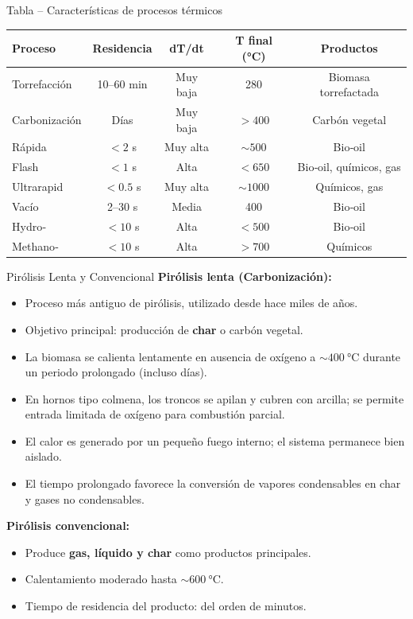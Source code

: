 \documentclass[../../main.tex]{subfiles}
\begin{document}
\begin{frame}{Tabla – Características de procesos térmicos}
\small
\begin{tabular}{@{}lcccc@{}}
\toprule
\textbf{Proceso} & \textbf{Residencia} & \textbf{dT/dt} & \textbf{T final (°C)} & \textbf{Productos} \\
\midrule
Torrefacción   & 10--60 min & Muy baja  & 280      & Biomasa torrefactada \\
Carbonización  & Días       & Muy baja  & $>400$   & Carbón vegetal \\
Rápida         & $<2$ s     & Muy alta  & $\sim500$ & Bio‑oil \\
Flash          & $<1$ s     & Alta      & $<650$   & Bio‑oil, químicos, gas \\
Ultrarapid     & $<0.5$ s   & Muy alta  & $\sim1000$ & Químicos, gas \\
Vacío          & 2--30 s    & Media     & 400      & Bio‑oil \\
Hydro‑         & $<10$ s    & Alta      & $<500$   & Bio‑oil \\
Methano‑       & $<10$ s    & Alta      & $>700$   & Químicos \\
\bottomrule
\end{tabular}
\end{frame}

\begin{frame}{Pirólisis Lenta y Convencional}
\footnotesize
\textbf{Pirólisis lenta (Carbonización):}
\begin{itemize}
  \item Proceso más antiguo de pirólisis, utilizado desde hace miles de años.
  \item Objetivo principal: producción de \textbf{char} o carbón vegetal.
  \item La biomasa se calienta lentamente en ausencia de oxígeno a $\sim\SI{400}{\degreeCelsius}$ durante un periodo prolongado (incluso días).
  \item En hornos tipo colmena, los troncos se apilan y cubren con arcilla; se permite entrada limitada de oxígeno para combustión parcial.
  \item El calor es generado por un pequeño fuego interno; el sistema permanece bien aislado.
  \item El tiempo prolongado favorece la conversión de vapores condensables en char y gases no condensables.
\end{itemize}

\textbf{Pirólisis convencional:}
\begin{itemize}
  \item Produce \textbf{gas, líquido y char} como productos principales.
  \item Calentamiento moderado hasta $\sim\SI{600}{\degreeCelsius}$.
  \item Tiempo de residencia del producto: del orden de minutos.
\end{itemize}
\end{frame}
\end{document}
